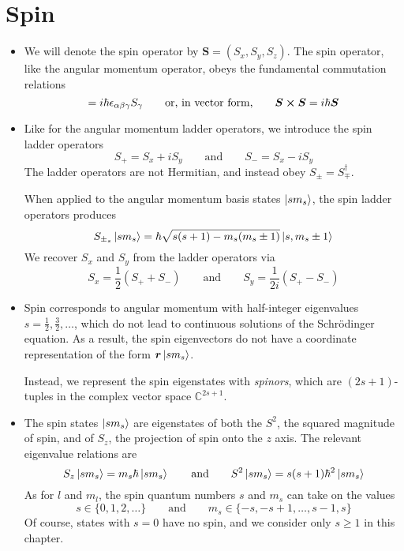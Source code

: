 \documentclass[11pt, a4paper]{article}
\newcommand{\eqtext}[1]{\qquad \text{#1} \qquad}
\newcommand{\Schro}{Schr\"{o}dinger\xspace}
\newcommand{\Herm}{Hermitian\xspace}
\renewcommand{\vec}[1]{\bm{#1}}  %
\renewcommand{\r}{\vec{r}}  %
\renewcommand{\S}{\vec{S}}  %
\begin{document}
\section{Spin}
\begin{itemize}
	\item We will denote the spin operator by $ \S = (S_{x}, S_{y}, S_{z}) $. The spin operator, like the angular momentum operator, obeys the fundamental commutation relations
	\begin{equation*}
		[S_{\alpha}, S_{\beta}] = i \hbar \epsilon_{\alpha \beta \gamma}S_{\gamma} \eqtext{or, in vector form,} \S \cross \S = i \hbar \S
	\end{equation*}
	
	\item Like for the angular momentum ladder operators, we introduce the spin ladder operators
	\begin{equation*}
		S_{+} = S_{x} + iS_{y} \eqtext{and} S_{-} = S_{x} - i S_{y}
	\end{equation*}
	The ladder operators are not \Herm, and instead obey $ S_{\pm} = S_{\mp}^{\dagger} $. 
	
	When applied to the angular momentum basis states $ \ket{sm_{s}} $, the spin ladder operators produces
	\begin{equation*}
		S_{\pm_{s}} \ket{sm_{s}} = \hbar \sqrt{s(s+1) - m_{s}(m_{s} \pm 1)}\ket{s, m_{s} \pm 1}
	\end{equation*}
	We recover $ S_{x} $ and $ S_{y} $ from the ladder operators via
	\begin{equation*}
		S_{x} = \frac{1}{2}(S_{+} + S_{-}) \eqtext{and} S_{y} = \frac{1}{2i}(S_{+} - S_{-}) 
	\end{equation*}
	
	\item Spin corresponds to angular momentum with half-integer eigenvalues $ s = \frac{1}{2}, \frac{3}{2}, \ldots $, which do not lead to continuous solutions of the \Schro equation. As a result, the spin eigenvectors do not have a coordinate representation of the form $ \r \ket{sm_{s}} $. 
	
	Instead, we represent the spin eigenstates with \textit{spinors}, which are $ (2s+1) $-tuples in the complex vector space $ \mathbb{C}^{2s + 1} $. 
	
	\item The spin states $ \ket{sm_{s}} $ are eigenstates of both the $ S^{2} $, the squared magnitude of spin, and of $ S_{z} $, the projection of spin onto the $ z $ axis. The relevant eigenvalue relations are
	\begin{equation*}
		S_{z}\ket{sm_{s}} = m_{s}\hbar \ket{sm_{s}} \eqtext{and} S^{2}\ket{sm_{s}} = s(s+1) \hbar^{2} \ket{sm_{s}}
	\end{equation*}
	As for $ l $ and $ m_{l} $, the spin quantum numbers $ s $ and $ m_{s} $ can take on the values
	\begin{equation*}
		s \in \{0, 1, 2, \ldots\} \eqtext{and} m_{s} \in \{-s, -s+1, \ldots, s-1, s\}
	\end{equation*}
	Of course, states with $ s = 0 $ have no spin, and we consider only $ s \geq 1 $ in this chapter.
	
	
\end{itemize}
\end{document}
